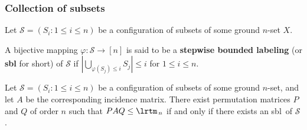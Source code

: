 \documentclass[unknownkeysallowed,11pt]{beamer}
\newcommand{\SBL}{sbl}
\begin{document}

\begin{frame}
  \frametitle{Collection of subsets}

  \begin{definition}
    Let $\mathcal{S} = (S_i : 1 \leq i \leq n)$ be a configuration of subsets of some
    ground $n$-set $X$.

    A bijective mapping $\varphi : \mathcal{S} \to [n]$ is said to be a
    \textbf{stepwise bounded labeling} (or \textbf{\SBL} for short) of $\mathcal{S}$ if
    $\left|\bigcup_{\varphi(S_j) \leq i}S_j\right| \leq i$
    for $1 \leq i \leq n$.
  \end{definition}

  \bigskip

  \begin{lemma}
      Let $\mathcal{S} = (S_i : 1 \leq i \leq n)$ be a configuration of subsets of
      some ground $n$-set, and let $A$ be the corresponding incidence matrix.
      There exist permutation matrices $P$ and $Q$ of order $n$
      such that $PAQ \leq \lrtm_{\,n}$ if and only if
      there exists an \SBL\ of $\mathcal{S}$.
  \end{lemma}
\end{frame}

\end{document}
